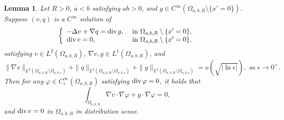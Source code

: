 \documentclass[12pt]{article}
\newtheorem{lem}{Lemma}[section]
\newcommand{\dive}{{\rm div \hspace{0.05cm} }}
\begin{document}
\begin{lem}\label{lem:2_4}
	Let $R>0$, $a<b$ satisfying $ab>0$, and $g\in C^{\infty}(\Omega_{a, b, R}\setminus\{x'=0\})$. Suppose $(v, q)$ is a $C^{\infty}$ solution of 
	\begin{equation}\label{eq:lem:2_4:1}
	\left\{
	\begin{array}{ll}
			-\Delta v+\nabla q=\dive g, & \textrm{ in }\Omega_{a, b, R}\setminus\{x'=0\}, \\
			\dive v=0, & \textrm{ in }\Omega_{a, b, R}\setminus\{x'=0\},
	\end{array}
	\right.
	\end{equation}
	satisfying $v\in L^2(\Omega_{a, b, R})$, $\nabla v, g\in L^1(\Omega_{a, b, R})$, and 
	\begin{equation}\label{eq:lem:2_4:2}
		\|\nabla v\|_{L^2(\Omega_{a, b, R}\setminus\Omega_{a, b, \epsilon})}+\|q\|_{L^2(\Omega_{a, b, R}\setminus\Omega_{a, b, \epsilon})} +\|g\|_{L^2(\Omega_{a, b, R}\setminus\Omega_{a, b, \epsilon})}
		=o( \sqrt{| \ln \epsilon|}), \textrm{ as }\epsilon\to 0^+. 
	\end{equation}
	Then for any $\varphi\in C_c^{\infty}(\Omega_{a, b, R})$ satisfying $\dive \varphi=0$, it holds that 
	\begin{equation}\label{eq:lem:2_4:3}
		\int_{\Omega_{a, b, R}}\nabla v\cdot \nabla \varphi 
		+g\cdot \nabla \varphi=0, 
	\end{equation}
	and $ \dive v=0$ in $\Omega_{a, b, R}$ 
	in distribution sense. 
\end{lem}
\end{document}
